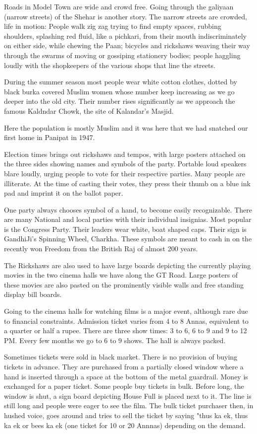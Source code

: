 Roads in Model Town are wide and crowd free. Going through the galiyaan
(narrow streets) of the Shehar is another story. The narrow streets are
crowded, life in motion: People walk zig zag trying to find empty spaces,
rubbing shoulders, splashing red fluid, like a pichkari, from their mouth
indiscriminately on either side, while chewing the Paan; bicycles and
rickshaws weaving their way through the swarms of moving or gossiping
stationery bodies; people haggling loudly with the shopkeepers of the
various shops that line the streets. 

During the summer season most people wear white cotton clothes, dotted by
black burka covered Muslim women whose number keep increasing as we go
deeper into the old city. Their number rises significantly as we approach
the famous Kaldndar Chowk, the site of Kalandar's Masjid. 

Here the population is mostly Muslim and it was here that we had snatched
our first home in Panipat in 1947. 

Election times brings out rickshaws and tempos, with large posters
attached on the three sides showing names and symbols of the party.
Portable loud speakers blare loudly, urging people to vote for their
respective parties. Many people are illiterate. At the time of casting
their votes, they press their thumb on a blue ink pad and imprint it on
the ballot paper. 

One party always chooses symbol of a hand, to become easily recognizable.
There are many National and local parties with their individual insignias.
Most popular is the Congress Party. Their leaders wear white, boat shaped
caps. Their sign is GandhiJi's Spinning Wheel, Charkha. These symbols are
meant to cash in on the recently won Freedom from the British Raj of
almost 200 years. 

The Rickshaws are also used to have large boards depicting the currently
playing movies in the two cinema halls we have along the GT Road. Large
posters of these movies are also pasted on the prominently visible walls
and free standing display bill boards. 

Going to the cinema halls for watching films is a major event, although
rare due to financial constraints. Admission ticket varies from 4 to
8 Annas, equivalent to a quarter or half a rupee. There are three show
times: 3 to 6, 6 to 9 and 9 to 12 PM. Every few months we go to 6 to
9 shows. The hall is always packed. 

Sometimes tickets were sold in black market. There is no provision of
buying tickets in advance. They are purchased from a partially closed
window where a hand is inserted through a space at the bottom of the metal
guardrail. Money is exchanged for a paper ticket. Some people buy tickets
in bulk. Before long, the window is shut, a sign board depicting House
Full is placed next to it. The line is still long and people were eager to
see the film. The bulk ticket purchaser then, in hushed voice, goes around
and tries to sell the ticket by saying "thus ka ek, thus ka ek or bees ka
ek (one ticket for 10 or 20 Annnas) depending on the demand. 

